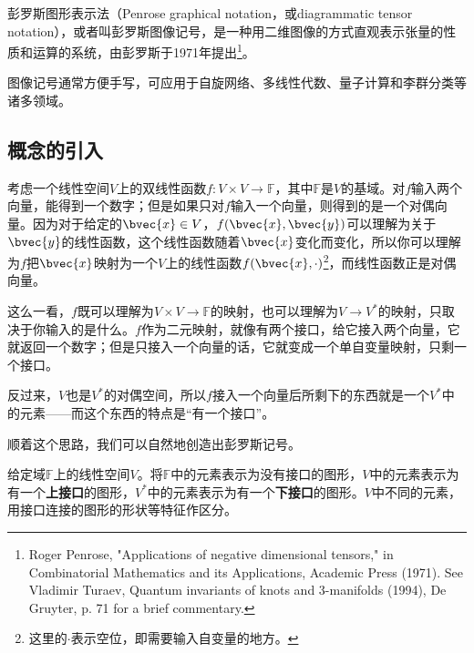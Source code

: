 



彭罗斯图形表示法（Penrose graphical notation，或diagrammatic tensor notation），或者叫彭罗斯图像记号，是一种用二维图像的方式直观表示张量的性质和运算的系统，由彭罗斯于1971年提出\footnote{Roger Penrose, "Applications of negative dimensional tensors," in Combinatorial Mathematics and its Applications, Academic Press (1971). See Vladimir Turaev, Quantum invariants of knots and 3-manifolds (1994), De Gruyter, p. 71 for a brief commentary.}。

图像记号通常方便手写，可应用于自旋网络、多线性代数、量子计算和李群分类等诸多领域。




\subsection{概念的引入}


考虑一个线性空间$V$上的双线性函数$f:V\times V\to\mathbb{F}$，其中$\mathbb{F}$是$V$的基域。对$f$输入两个向量，能得到一个数字；但是如果只对$f$输入一个向量，则得到的是一个对偶向量。因为对于给定的$\bvec{x}\in V$，$f(\bvec{x}, \bvec{y})$可以理解为关于$\bvec{y}$的线性函数，这个线性函数随着$\bvec{x}$变化而变化，所以你可以理解为$f$把$\bvec{x}$映射为一个$V$上的线性函数$f(\bvec{x}, \cdot)$\footnote{这里的$\cdot$表示空位，即需要输入自变量的地方。}，而线性函数正是对偶向量。

这么一看，$f$既可以理解为$V\times V\to\mathbb{F}$的映射，也可以理解为$V\to V^*$的映射，只取决于你输入的是什么。$f$作为二元映射，就像有两个接口，给它接入两个向量，它就返回一个数字；但是只接入一个向量的话，它就变成一个单自变量映射，只剩一个接口。

反过来，$V$也是$V^*$的对偶空间，所以$f$接入一个向量后所剩下的东西就是一个$V^*$中的元素——而这个东西的特点是“有一个接口”。

顺着这个思路，我们可以自然地创造出彭罗斯记号。



\begin{definition}{}

给定域$\mathbb{F}$上的线性空间$V$。将$\mathbb{F}$中的元素表示为没有接口的图形，$V$中的元素表示为有一个\textbf{上接口}的图形，$V^*$中的元素表示为有一个\textbf{下接口}的图形。$V$中不同的元素，用接口连接的图形的形状等特征作区分。

\end{definition}




